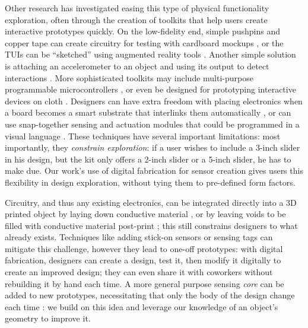     Other research has investigated easing this type of physical functionality exploration, often through the creation of toolkits that help users create interactive prototypes quickly. On the low-fidelity end, simple pushpins and copper tape can create circuitry for testing with cardboard mockups \cite{hudson-boxes}, or the TUIs can be ``sketched'' using augmented reality tools \cite{nam-sketchingtuis}. Another simple solution is attaching an accelerometer to an object and using its output to detect interactions \cite{hook-making}. More sophisticated toolkits may include multi-purpose programmable microcontrollers \cite{arduino}, or even be designed for prototyping interactive devices on cloth \cite{buechley-lilypad}. Designers can have extra freedom with placing electronics when a board becomes a smart substrate that interlinks them automatically \cite{villar-voodooio}, or can use snap-together sensing and actuation modules \cite{avrahami-switcharoo, greenberg-phidgets, lee-calder} that could be programmed in a visual language \cite{villar-gadgeteer}. These techniques have several important limitations: most importantly, they \emph{constrain exploration}: if a user wishes to include a 3-inch slider in his design, but the kit only offers a 2-inch slider or a 5-inch slider, he has to make due. Our work's use of digital fabrication for sensor creation gives users this flexibility in design exploration, without tying them to pre-defined form factors.
    
    Circuitry, and thus any existing electronics, can be integrated directly into a 3D printed object by laying down conductive material \cite{sells-reprap,voxel8,sarik-tracebrush}, or by leaving voids to be filled with conductive material post-print \cite{savage-sot}; this still constrains designers to what already exists. Techniques like adding stick-on sensors or sensing tags \cite{maynes-aminzade-eyepatch,yeo-stickear} can mitigate this challenge, however they lead to one-off prototypes: with digital fabrication, designers can create a design, test it, then modify it digitally to create an improved design; they can even share it with coworkers without rebuilding it by hand each time. A more general purpose sensing \emph{core} can be added to new prototypes, necessitating that only the body of the design change each time \cite{doering-composition}: we build on this idea and leverage our knowledge of an object's geometry to improve it.
    
